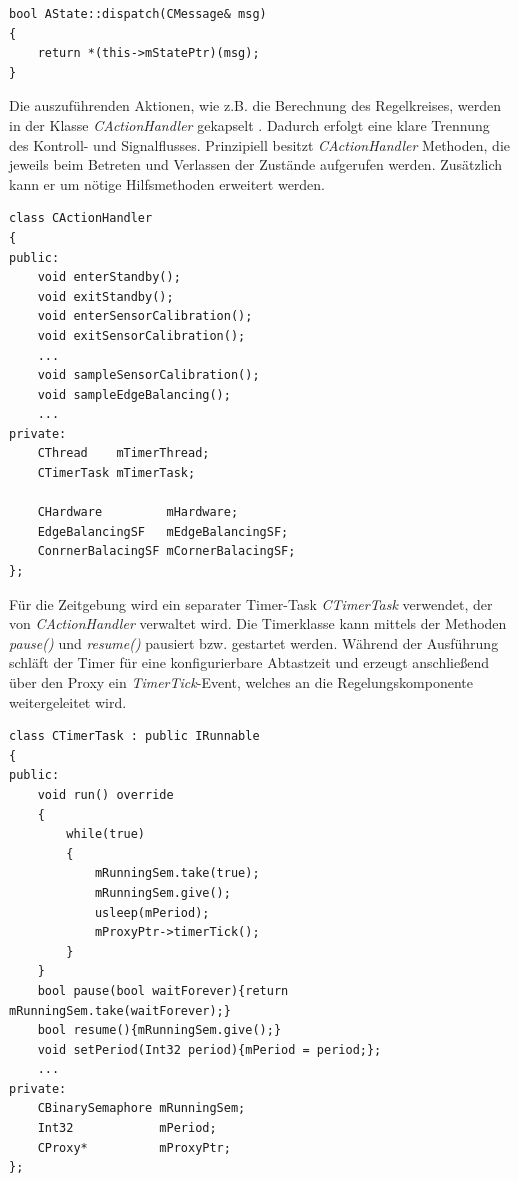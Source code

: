 \begin{lstlisting}[caption={Defintion der \textit{dispatch()}-Methode},captionpos=b]
bool AState::dispatch(CMessage& msg)
{
	return *(this->mStatePtr)(msg);
}
\end{lstlisting} 

Die auszuführenden Aktionen, wie z.B. die Berechnung des Regelkreises, werden in der Klasse \textit{CActionHandler} gekapselt \cite[S. 225]{Wietzke1}. Dadurch erfolgt eine klare Trennung des Kontroll- und Signalflusses. Prinzipiell besitzt \textit{CActionHandler} Methoden, die jeweils beim Betreten und Verlassen der Zustände aufgerufen werden. Zusätzlich kann er um nötige Hilfsmethoden erweitert werden.
\begin{lstlisting}[caption={Beispielhafte Implementierung des Actionhandlers},captionpos=b]
class CActionHandler
{
public:
	void enterStandby();
	void exitStandby();
	void enterSensorCalibration();
	void exitSensorCalibration();
	...
	void sampleSensorCalibration();
	void sampleEdgeBalancing();
	...
private:
	CThread    mTimerThread;
	CTimerTask mTimerTask;
	
	CHardware         mHardware;
	EdgeBalancingSF   mEdgeBalancingSF;
	ConrnerBalacingSF mCornerBalacingSF;
};
\end{lstlisting}
Für die Zeitgebung wird ein separater Timer-Task \textit{CTimerTask} verwendet, der von \textit{CActionHandler} verwaltet wird. Die Timerklasse kann mittels der Methoden \textit{pause()} und \textit{resume()} pausiert bzw. gestartet werden. Während der Ausführung schläft der Timer für eine konfigurierbare Abtastzeit und erzeugt anschließend über den Proxy ein \textit{TimerTick}-Event, welches an die Regelungskomponente weitergeleitet wird.
\begin{lstlisting}[caption={Aufbau des Timer-Tasks},captionpos=b]
class CTimerTask : public IRunnable
{
public:
	void run() override
	{
		while(true)
		{
			mRunningSem.take(true);
			mRunningSem.give();
			usleep(mPeriod);
			mProxyPtr->timerTick();
		}
	}
	bool pause(bool waitForever){return mRunningSem.take(waitForever);}
	bool resume(){mRunningSem.give();}
	void setPeriod(Int32 period){mPeriod = period;};
	...
private:
	CBinarySemaphore mRunningSem;
	Int32            mPeriod;
	CProxy*          mProxyPtr;
};
\end{lstlisting}
